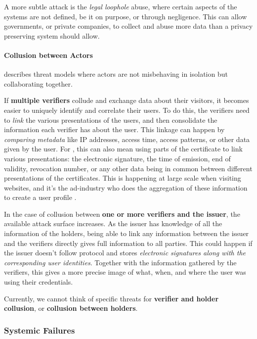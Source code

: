 A more subtle attack is the \emph{legal loophole} abuse, where certain aspects of the systems
are not defined, be it on purpose, or through negligence.
This can allow governments, or private companies, to collect and abuse
more data than a privacy preserving system should allow.

\paragraph{Collusion between Actors} describes threat models where actors are not misbehaving in isolation but collaborating together.

If \textbf{multiple verifiers} collude and exchange data about their visitors,
it becomes easier to uniquely identify and correlate their users.
To do this, the verifiers need to \emph{link} the various presentations of the users,
and then consolidate the information each verifier has about the user.
This linkage can happen by \emph{comparing metadata} like IP addresses, access
time, access patterns, or other data given by the user.
For \eid, this can also mean using parts of the certificate to link various presentations:
 the electronic signature, the time of emission, end of validity, revocation number,
or any other data being in common between different presentations of the certificates.
This is happening at large scale when visiting websites, and it's the ad-industry who
does the aggregation of these information to create a user profile \cite{BARW16}.

In the case of collusion between \textbf{one or more verifiers and the issuer},
the available attack surface increases.
As the issuer has knowledge of all the information of the holders, being able to
link any information between the issuer and the verifiers directly gives full
information to all parties.
This could happen if the issuer doesn't follow protocol and stores
\emph{electronic signatures along with the corresponding user identities}.
Together with the information gathered by the verifiers, this gives a more precise
image of what, when, and where the user was using their credentials.

Currently, we cannot think of specific threats for \textbf{verifier and holder collusion},
or \textbf{collusion between holders}.

\subsubsection{Systemic Failures}

